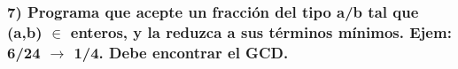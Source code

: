 \subsubsection*{7) Programa que acepte un fracción del tipo a/b tal que (a,b) $\in$ enteros, y la reduzca a sus términos mínimos. Ejem: 6/24 $\rightarrow$ 1/4. Debe encontrar el GCD.}